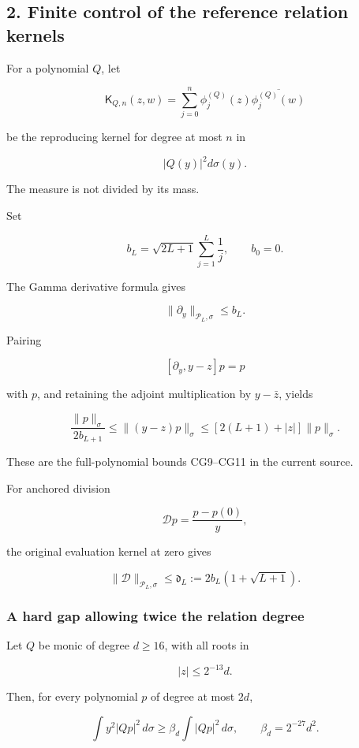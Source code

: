 \documentclass[11pt]{article}
\begin{document}
\subsection{2. Finite control of the reference relation kernels}\label{finite-control-of-the-reference-relation-kernels}

For a polynomial \(Q\), let

\[
\mathsf K_{Q,n}(z,w)
=
\sum_{j=0}^{n}\phi_j^{(Q)}(z)
\overline{\phi_j^{(Q)}(w)}
\]

be the reproducing kernel for degree at most \(n\) in

\[
|Q(y)|^2d\sigma(y).
\]

The measure is not divided by its mass.

Set

\[
b_L=\sqrt{2L+1}\sum_{j=1}^{L}\frac1j,\qquad b_0=0.
\]

The Gamma derivative formula gives

\[
\|\partial_y\|_{\mathcal P_L,\sigma}\le b_L.
\]

Pairing

\[
[\partial_y,y-z]p=p
\]

with \(p\), and retaining the adjoint multiplication by \(y-\bar z\), yields

\[
\boxed{
\frac{\|p\|_\sigma}{2b_{L+1}}
\le\|(y-z)p\|_\sigma
\le[2(L+1)+|z|]\|p\|_\sigma.
}
\tag{14}
\]

These are the full-polynomial bounds CG9--CG11 in the current source.

For anchored division

\[
\mathscr Dp=\frac{p-p(0)}y,
\]

the original evaluation kernel at zero gives

\[
\boxed{
\|\mathscr D\|_{\mathcal P_L,\sigma}
\le
\mathfrak d_L:=2b_L(1+\sqrt{L+1}).
}
\tag{15}
\]

\subsubsection{A hard gap allowing twice the relation degree}\label{a-hard-gap-allowing-twice-the-relation-degree}

Let \(Q\) be monic of degree \(d\ge16\), with all roots in

\[
|z|\le2^{-13}d.
\]

Then, for every polynomial \(p\) of degree at most \(2d\),

\[
\boxed{
\int y^2|Qp|^2\,d\sigma
\ge\beta_d\int|Qp|^2\,d\sigma,
\qquad
\beta_d=2^{-27}d^2.
}
\tag{16}
\]
\end{document}
